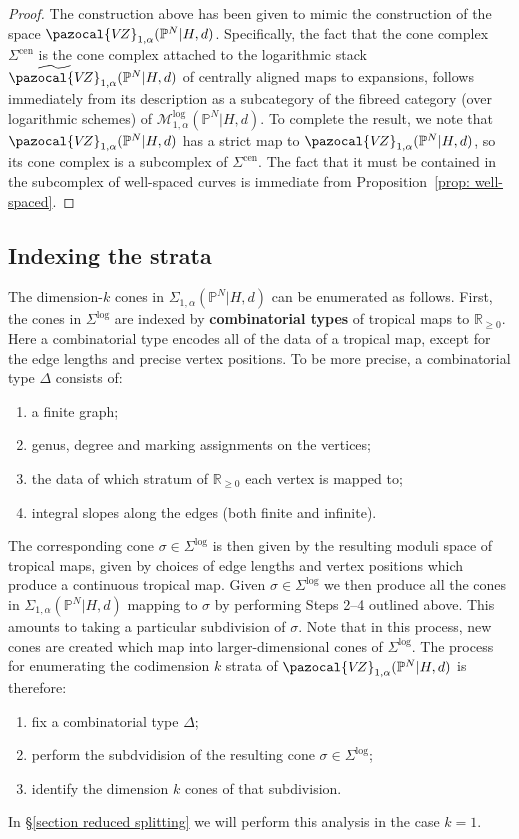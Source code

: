 \documentclass[11pt]{amsart}
\newcommand{\PP}{\mathbb P}
\newcommand{\VZ}{\pazocal{V\!Z}}
\newcommand{\RR}{\mathbb{R}}
\theoremstyle{definition}
\theoremstyle{definition}
\begin{document}
\begin{proof}
The construction above has been given to mimic the construction of the space $
\VZ_{1,\alpha}(\mathbb P^N|H,d)$. Specifically, the fact that the cone complex $\Sigma^{\mathrm{cen}}$ is the cone complex attached to the logarithmic stack $\widetilde{\VZ}_{1,\alpha}(\mathbb P^N|H,d)$ of centrally aligned maps to expansions, follows immediately from its description as a subcategory of the fibreed category (over logarithmic schemes) of $\mathcal M^{\mathrm{log}}_{1,\alpha}(\mathbb P^N|H,d)$. To complete the result, we note that $
\VZ_{1,\alpha}(\mathbb P^N|H,d)$ has a strict map to $
\VZ_{1,\alpha}(\mathbb P^N|H,d)$, so its cone complex is a subcomplex of $\Sigma^{\mathrm{cen}}$. The fact that it must be contained in the subcomplex of well-spaced curves is immediate from Proposition~\ref{prop: well-spaced}.
\end{proof}

\subsection{Indexing the strata} \label{subsection indexing strata} The dimension-$k$ cones in $\Sigma_{1,\alpha}(\PP^N|H,d)$ can be enumerated as follows. First, the cones in $\Sigma^{\operatorname{log}}$ are indexed by \textbf{combinatorial types} of tropical maps to $\RR_{\geq 0}$. Here a combinatorial type encodes all of the data of a tropical map, except for the edge lengths and precise vertex positions. To be more precise, a combinatorial type $\Delta$ consists of:
\begin{enumerate}
\item a finite graph;
\item genus, degree and marking assignments on the vertices;
\item the data of which stratum of $\RR_{\geq 0}$ each vertex is mapped to;
\item integral slopes along the edges (both finite and infinite).
\end{enumerate}
The corresponding cone $\sigma \in \Sigma^{\operatorname{log}}$ is then given by the resulting moduli space of tropical maps, given by choices of edge lengths and vertex positions which produce a continuous tropical map. Given $\sigma\in \Sigma^{\operatorname{log}}$ we then produce all the cones in $\Sigma_{1,\alpha}(\PP^N|H,d)$ mapping to $\sigma$ by performing Steps 2--4 outlined above. This amounts to taking a particular subdivision of $\sigma$. Note that in this process, new cones are created which map into larger-dimensional cones of $\Sigma^{\operatorname{log}}$. The process for enumerating the codimension $k$ strata of $\VZ_{1,\alpha}(\PP^N|H,d)$ is therefore:
\begin{enumerate}
\item fix a combinatorial type $\Delta$;
\item perform the subdvidision of the resulting cone $\sigma \in \Sigma^{\operatorname{log}}$;
\item identify the dimension $k$ cones of that subdivision.
\end{enumerate}
In \S \ref{section reduced splitting} we will perform this analysis in the case $k=1$.
\end{document}
